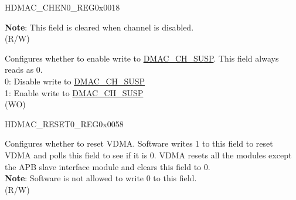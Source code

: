 \begin{register}{H}{DMAC\_CHEN0\_REG}{0x0018}
\begin{regdesc}
\begin{reglist}
\textbf{Note}: This field is cleared when channel  is disabled. \\
(R/W)
\label{fielddesc:DMACCH1SUSPWE}\item [DMAC\_CH\regindex{n}\_SUSP\_WE (\regindex{n}: 1-4)] Configures whether to enable write to \hyperref[fielddesc:DMACCH1SUSP]{DMAC\_CH\_SUSP}. This field always reads as 0.\\ 
0: Disable write to \hyperref[fielddesc:DMACCH1SUSP]{DMAC\_CH\_SUSP} \\
1: Enable write to \hyperref[fielddesc:DMACCH1SUSP]{DMAC\_CH\_SUSP} \\
(WO)

\end{reglist}\end{regdesc}
\end{register}


\begin{register}{H}{DMAC\_RESET0\_REG}{0x0058}\label{regdesc:DMACRESET0REG}
%
%
\regnewline%
\begin{regdesc}\begin{reglist}
\label{fielddesc:DMACDMACRST}\item [DMAC\_DMAC\_RST] Configures whether to reset VDMA. Software writes 1 to this field to reset VDMA and polls this field to see if it is 0. VDMA resets all the modules except the APB slave interface module and clears this field to 0. \\
\textbf{Note}: Software is not allowed to write 0 to this field. \\
(R/W)
\end{reglist}\end{regdesc}
\end{register}


